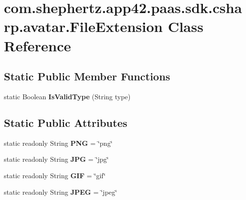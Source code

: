 \hypertarget{classcom_1_1shephertz_1_1app42_1_1paas_1_1sdk_1_1csharp_1_1avatar_1_1_file_extension}{\section{com.\+shephertz.\+app42.\+paas.\+sdk.\+csharp.\+avatar.\+File\+Extension Class Reference}
\label{classcom_1_1shephertz_1_1app42_1_1paas_1_1sdk_1_1csharp_1_1avatar_1_1_file_extension}
}
\subsection*{Static Public Member Functions}
\begin{DoxyCompactItemize}
\item 
\hypertarget{classcom_1_1shephertz_1_1app42_1_1paas_1_1sdk_1_1csharp_1_1avatar_1_1_file_extension_ac09e0d3272d5f1fe4251b2719f1d1448}{static Boolean {\bfseries Is\+Valid\+Type} (String type)}\label{classcom_1_1shephertz_1_1app42_1_1paas_1_1sdk_1_1csharp_1_1avatar_1_1_file_extension_ac09e0d3272d5f1fe4251b2719f1d1448}

\end{DoxyCompactItemize}
\subsection*{Static Public Attributes}
\begin{DoxyCompactItemize}
\item 
\hypertarget{classcom_1_1shephertz_1_1app42_1_1paas_1_1sdk_1_1csharp_1_1avatar_1_1_file_extension_af880d4677dacb160b609b5c262900bf3}{static readonly String {\bfseries P\+N\+G} = \char`\"{}png\char`\"{}}\label{classcom_1_1shephertz_1_1app42_1_1paas_1_1sdk_1_1csharp_1_1avatar_1_1_file_extension_af880d4677dacb160b609b5c262900bf3}

\item 
\hypertarget{classcom_1_1shephertz_1_1app42_1_1paas_1_1sdk_1_1csharp_1_1avatar_1_1_file_extension_a3c2c07f3eeeaec3d9fcfe09893204569}{static readonly String {\bfseries J\+P\+G} = \char`\"{}jpg\char`\"{}}\label{classcom_1_1shephertz_1_1app42_1_1paas_1_1sdk_1_1csharp_1_1avatar_1_1_file_extension_a3c2c07f3eeeaec3d9fcfe09893204569}

\item 
\hypertarget{classcom_1_1shephertz_1_1app42_1_1paas_1_1sdk_1_1csharp_1_1avatar_1_1_file_extension_a7fcae2ce6797e932bcfbbde98fedbf21}{static readonly String {\bfseries G\+I\+F} = \char`\"{}gif\char`\"{}}\label{classcom_1_1shephertz_1_1app42_1_1paas_1_1sdk_1_1csharp_1_1avatar_1_1_file_extension_a7fcae2ce6797e932bcfbbde98fedbf21}

\item 
\hypertarget{classcom_1_1shephertz_1_1app42_1_1paas_1_1sdk_1_1csharp_1_1avatar_1_1_file_extension_a079945c53f736cac82a26d583876788a}{static readonly String {\bfseries J\+P\+E\+G} = \char`\"{}jpeg\char`\"{}}\label{classcom_1_1shephertz_1_1app42_1_1paas_1_1sdk_1_1csharp_1_1avatar_1_1_file_extension_a079945c53f736cac82a26d583876788a}

\end{DoxyCompactItemize}
